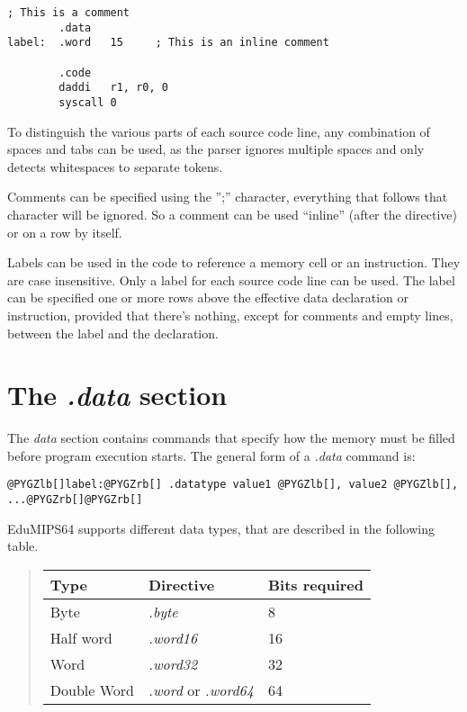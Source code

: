 \documentclass[letterpaper,10pt,english]{sphinxmanual}
\begin{document}
\begin{Verbatim}[commandchars=@\[\]]
; This is a comment
        .data
label:  .word   15     ; This is an inline comment

        .code
        daddi   r1, r0, 0
        syscall 0
\end{Verbatim}

To distinguish the various parts of each source code line, any combination of
spaces and tabs can be used, as the parser ignores multiple spaces and only
detects whitespaces to separate tokens.

Comments can be specified using the '';'' character, everything that follows
that character will be ignored. So a comment can be used ``inline'' (after the
directive) or on a row by itself.

Labels can be used in the code to reference a memory cell or an
instruction.  They are case insensitive. Only a label for each source code line
can be used.  The label can be specified one or more rows above the effective
data declaration or instruction, provided that there's nothing, except for
comments and empty lines, between the label and the declaration.


\section{The \emph{.data} section}
\label{source-files-format:the-data-section}
The \emph{data} section contains commands that specify how the memory must be
filled before program execution starts. The general form of a \emph{.data} command
is:

\begin{Verbatim}[commandchars=@\[\]]
@PYGZlb[]label:@PYGZrb[] .datatype value1 @PYGZlb[], value2 @PYGZlb[], ...@PYGZrb[]@PYGZrb[]
\end{Verbatim}

EduMIPS64 supports different data types, that are described in the following
table.
\begin{quote}

\begin{tabulary}{\linewidth}{|L|L|L|}
\hline
\textbf{
Type
} & \textbf{
Directive
} & \textbf{
Bits required
}\\
\hline

Byte
 & 
\emph{.byte}
 & 
8
\\

Half word
 & 
\emph{.word16}
 & 
16
\\

Word
 & 
\emph{.word32}
 & 
32
\\

Double Word
 & 
\emph{.word} or \emph{.word64}
 & 
64
\\
\hline
\end{tabulary}

\end{quote}
\end{document}
